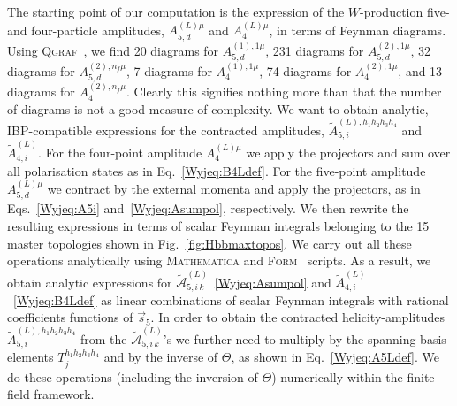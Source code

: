 \documentclass[main.tex]{subfiles}
\begin{document}
The starting point of our computation is the expression of the $W$-production five- and
four-particle amplitudes, $A_{5,d}^{(L)\mu}$ and $A_4^{(L)\mu}$, in terms of Feynman diagrams. Using \textsc{Qgraf}~\cite{Nogueira:1991ex}, we find 20 diagrams for $A_{5,d}^{(1),1 \mu}$, 231 diagrams for $A_{5,d}^{(2),1 \mu}$, 32 diagrams for $A_{5,d}^{(2),n_f \mu}$, 7 diagrams for $A_{4}^{(1),1 \mu}$, 74 diagrams for $A_{4}^{(2),1 \mu}$, and 13 diagrams for $A_{4}^{(2),n_f \mu}$. Clearly this signifies nothing more than that the number of diagrams is not a good measure of complexity. We want to obtain analytic, IBP-compatible expressions for the contracted amplitudes, $\tilde{A}_{5,i}^{(L),h_1 h_2 h_3 h_4}$ and $\tilde{A}_{4,i}^{(L)}$. For the four-point amplitude $A^{(L)\mu}_{4}$ we apply the projectors and sum over all polarisation states as in Eq.~\eqref{Wyjeq:B4Ldef}. For the five-point amplitude $A^{(L)\mu}_{5,d}$ we contract by the external momenta and apply the projectors, as in Eqs.~\eqref{Wyjeq:A5i} and~\eqref{Wyjeq:Asumpol}, respectively. We then rewrite the resulting expressions in terms of scalar Feynman integrals belonging to the 15 master topologies shown in %
Fig.~\ref{fig:Hbbmaxtopos}. We carry out all these operations analytically using \textsc{Mathematica} and \textsc{Form}~\cite{Kuipers:2012rf,Ruijl:2017dtg} scripts. As a result, we obtain analytic expressions for $\tilde{\mathcal{A}}_{5,i\, k}^{(L)}$~\eqref{Wyjeq:Asumpol} and $\tilde{A}_{4,i}^{(L)}$~\eqref{Wyjeq:B4Ldef} as linear combinations of scalar Feynman integrals with rational coefficients functions of $\vec{s}_5$. 
In order to obtain the contracted helicity-amplitudes $\tilde{A}_{5,i}^{(L), h_1h_2h_3h_4}$ from the $\tilde{\mathcal{A}}_{5,i\, k}^{(L)}$'s we further need to multiply by the spanning basis elements $T^{h_1h_2h_3h_4}_{j}$ and by the inverse of $\Theta$, as shown in Eq.~\eqref{Wyjeq:A5Ldef}. We do these operations (including the inversion of $\Theta$) numerically within the finite field framework.
\end{document}
